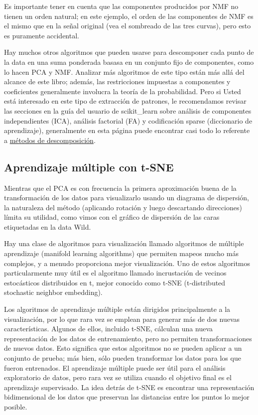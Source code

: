  Es importante tener en cuenta que las componentes producidos por NMF no tienen un orden natural; en este ejemplo, el orden de las componentes de NMF es el mismo que en la señal original (vea el sombreado de las tres curvas), pero esto es puramente accidental.


Hay muchos otros algoritmos que pueden usarse para descomponer cada punto de la data en
una suma ponderada basasa en un conjunto fijo de componentes, como lo hacen PCA y NMF.  Analizar más algoritmos de este tipo están más allá del alcance de este libro;  además, las restricciones impuestas a
componentes y coeficientes generalmente involucra  la teoría de la probabilidad.  Pero si Usted está interesado en este tipo de extracción de patrones, le recomendamos revisar las secciones en la guía del usuario de {\ttfamily scikit\_learn} sobre análisis de componentes independientes (ICA), análisis factorial (FA) y  codificación sparse (diccionario de aprendizaje), generalmente en esta página puede encontrar casi todo lo referente a  \href{https://scikit-learn.org/stable/modules/decomposition.html}{\color{vino} métodos de descomposición}.  


\subsection{Aprendizaje múltiple con t-SNE}


Mientras que el PCA es con frecuencia  la  primera aproximación  buena  de la transformación de los  datos para visualizarlo usando un diagrama de dispersión, la naturaleza del método (aplicando 
rotación y luego descartando direcciones) límita su utilidad, como vimos con el gráfico de dispersión
de las caras etiquetadas en la data Wild.

Hay una clase de algoritmos para visualización llamado  algoritmos de múltiple aprendizaje (manifold learning algorithms)  que permiten mapeos mucho más complejos,  y a menudo proporciona mejor visualización. Uno de estos algoritmos  particularmente muy útil es el  algoritmo llamado   incrustación de vecinos estocásticos distribuidos en t, mejor conocido como t-SNE (t-distributed stochastic neighbor embedding).


Los algoritmos de aprendizaje múltiple están dirigidos principalmente a la visualización, por lo que rara vez se emplean para generar más de dos  nuevas características. Algunos de ellos, incluido t-SNE, 
cálculan una nueva representación de los datos de entrenamiento, pero no permiten transformaciones de nuevos
datos. Esto significa que estos algoritmos no se pueden aplicar a un conjunto de prueba;  
más bien, sólo pueden transformar los datos para los que fueron entrenados.  El aprendizaje múltiple puede ser útil para el análisis exploratorio de datos, pero rara vez se utiliza cuando el objetivo final es el aprendizaje supervisado. La idea detrás de t-SNE es encontrar una representación bidimensional de los datos que preservan las distancias entre los puntos lo mejor posible. 
 
